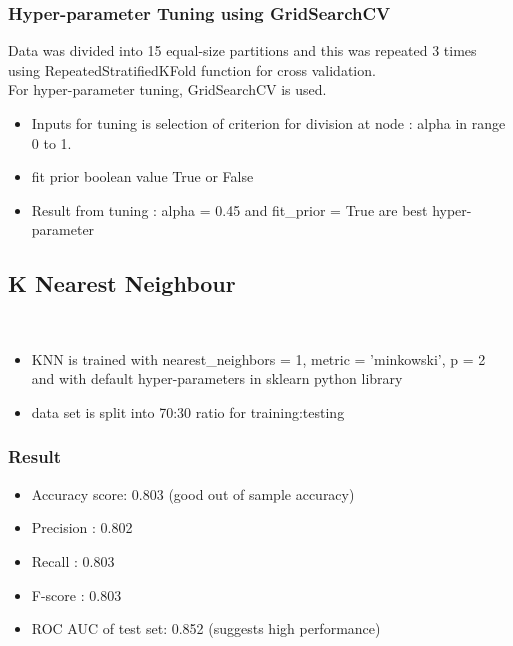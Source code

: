 \documentclass[12pt, letter]{article}
\begin{document}
\subsubsection{Hyper-parameter Tuning using GridSearchCV}
Data was divided into 15 equal-size partitions and this was repeated 3 times using RepeatedStratifiedKFold function for cross validation. \\

For hyper-parameter tuning, GridSearchCV is used. \\
\begin{itemize}
    \item Inputs for tuning is selection of criterion for division at node : alpha in range 0 to 1. 
    \item fit prior boolean value True or False 
    \item Result from tuning : alpha = 0.45 and fit\_prior = True are best hyper-parameter 
\end{itemize}
\subsection{K Nearest Neighbour } \\ 
\begin{itemize}
    \item KNN is trained with nearest\_neighbors = 1, metric = 'minkowski', p = 2 and with default hyper-parameters in sklearn python library  
    \item data set is split into 70:30 ratio for training:testing 
\end{itemize}

\subsubsection{Result}
\begin{itemize}
    \item Accuracy score: 0.803 (good out of sample accuracy)
    \item Precision : 0.802 
    \item Recall : 0.803 
    \item F-score : 0.803
    \item ROC AUC of test set: 0.852 (suggests high performance)
\end{itemize}
\end{document}
